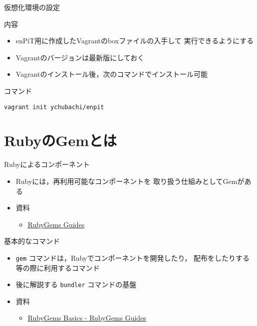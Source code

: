 \documentclass[t, aspectratio=169]{beamer}
\begin{document}
\begin{frame}[fragile,label=sec-1-3-4]{仮想化環境の設定}
 \begin{block}{内容}
\begin{itemize}
\item enPiT用に作成したVagrantのboxファイルの入手して
実行できるようにする
\item Vagrantのバージョンは最新版にしておく
\item Vagrantのインストール後，次のコマンドでインストール可能
\end{itemize}
\end{block}
\begin{block}{コマンド}
\begin{verbatim}
vagrant init ychubachi/enpit
\end{verbatim}
\end{block}
\end{frame}
\section{RubyのGemとは}
\label{sec-1-4}
\begin{frame}[label=sec-1-4-1]{Rubyによるコンポーネント}
\begin{itemize}
\item Rubyには，再利用可能なコンポーネントを
取り扱う仕組みとしてGemがある
\item 資料
\begin{itemize}
\item \href{http://guides.rubygems.org/}{RubyGems Guides}
\end{itemize}
\end{itemize}
\end{frame}

\begin{frame}[fragile,label=sec-1-4-2]{基本的なコマンド}
 \begin{itemize}
\item \texttt{gem} コマンドは，Rubyでコンポーネントを開発したり，
配布をしたりする等の際に利用するコマンド
\item 後に解説する \texttt{bundler} コマンドの基盤
\item 資料
\begin{itemize}
\item \href{http://guides.rubygems.org/rubygems-basics/}{RubyGems Basics - RubyGems Guides}
\end{itemize}
\end{itemize}
\end{frame}
\end{document}
